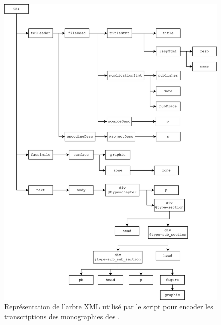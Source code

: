 \begin{figure}
    \centering
    \includegraphics[width=16cm]{img/arbre_xml.png}
    \caption[Représentation de l'arbre XML des fichiers TEI]{Représentation de l'arbre XML utilisé par le script \lse{} pour encoder les transcriptions des monographies des \odm.}
    \label{fig:xmltree1}
\end{figure}

